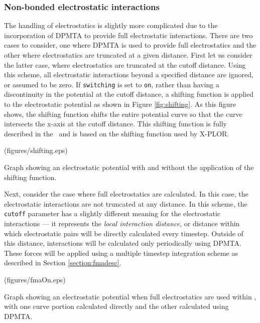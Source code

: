 \subsubsection{Non-bonded electrostatic interactions}
The handling of electrostatics is slightly
more complicated due to the incorporation of DPMTA to provide full
electrostatic interactions.  There are two cases to consider, one where
DPMTA is used to provide full electrostatics and the other where electrostatics
are truncated at a given distance.  
\prettypar
First let us consider the latter case, where electrostatics are truncated at
the cutoff distance.  Using this scheme, all electrostatic interactions
beyond a specified distance are ignored, or assumed to be zero.  If
\verb!switching! is set to \verb!on!, rather than having a discontinuity
in the potential
at the cutoff distance, a shifting function is applied to the electrostatic
potential as shown in Figure \ref{fig:shifting}.  As this figure shows, the
shifting function shifts the entire potential curve so that the curve
intersects the x-axis at the cutoff distance.  This shifting function
is fully described in the \PG\ and is based on the
shifting function used by X-PLOR.

\displayepsf[htb] (figures/shifting.eps) {
  \caption[Graph of electrostatic potential with and without shifting function]
  {{\small Graph showing an electrostatic potential with and without the
  application of the shifting function.}}
  \label{fig:shifting}
}

Next, consider the case where full electrostatics are calculated.  In this
case, the electrostatic interactions are not truncated at any distance.  In
this scheme, the \verb!cutoff! parameter has a slightly different meaning
for the electrostatic interactions --- it represents
the {\it local interaction distance\/}, or distance within which electrostatic
pairs will be directly calculated every timestep.  Outside of this distance,
interactions will be calculated only periodically using DPMTA.  These forces
will be applied using a multiple timestep integration scheme as described in
Section \ref{section:fmadesc}.

\displayepsf[htb] (figures/fmaOn.eps) {
  \caption[Graph of electrostatic split between short and long range forces]
  {{\small Graph showing an electrostatic potential 
  when full electrostatics are used within \NAMD, 
  with one curve portion calculated directly 
  and the other calculated using DPMTA.}}
  \label{fig:fmaOn}
}

